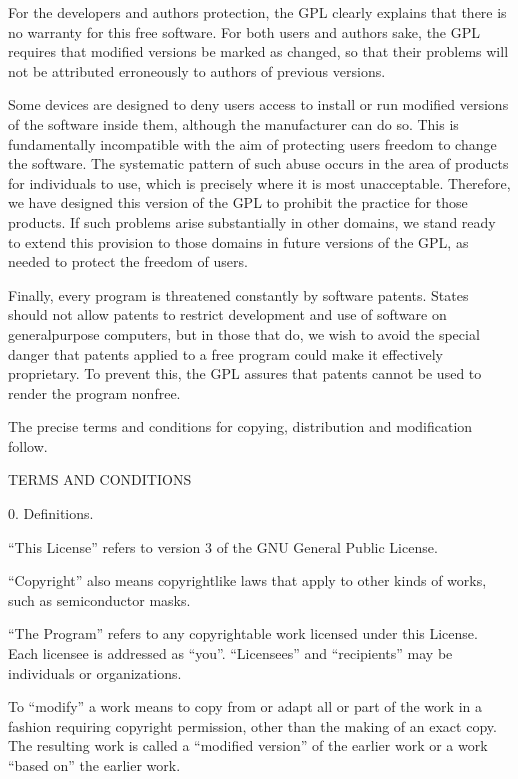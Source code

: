 \documentclass[letterpaper,10pt,english]{sphinxmanual}
\begin{document}
\begin{sphinxVerbatim}[commandchars=\\\{\}]
   For the developers\PYGZsq{} and authors\PYGZsq{} protection, the GPL clearly explains that
   there is no warranty for this free software. For both users\PYGZsq{} and authors\PYGZsq{}
   sake, the GPL requires that modified versions be marked as changed, so that
   their problems will not be attributed erroneously to authors of previous
   versions.

   Some devices are designed to deny users access to install or run modified
   versions of the software inside them, although the manufacturer can do
   so. This is fundamentally incompatible with the aim of protecting users\PYGZsq{}
   freedom to change the software. The systematic pattern of such abuse occurs
   in the area of products for individuals to use, which is precisely where it
   is most unacceptable. Therefore, we have designed this version of the GPL to
   prohibit the practice for those products. If such problems arise
   substantially in other domains, we stand ready to extend this provision to
   those domains in future versions of the GPL, as needed to protect the
   freedom of users.

   Finally, every program is threatened constantly by software patents. States
   should not allow patents to restrict development and use of software on
   general\PYGZhy{}purpose computers, but in those that do, we wish to avoid the
   special danger that patents applied to a free program could make it
   effectively proprietary. To prevent this, the GPL assures that patents
   cannot be used to render the program non\PYGZhy{}free.

   The precise terms and conditions for copying, distribution and modification
   follow.

 TERMS AND CONDITIONS

 0. Definitions.

   “This License” refers to version 3 of the GNU General Public License.

   “Copyright” also means copyright\PYGZhy{}like laws that apply to other kinds of
   works, such as semiconductor masks.

   “The Program” refers to any copyrightable work licensed under this
   License. Each licensee is addressed as “you”. “Licensees” and “recipients”
   may be individuals or organizations.

   To “modify” a work means to copy from or adapt all or part of the work in a
   fashion requiring copyright permission, other than the making of an exact
   copy. The resulting work is called a “modified version” of the earlier work
   or a work “based on” the earlier work.


\end{sphinxVerbatim}
\end{document}
